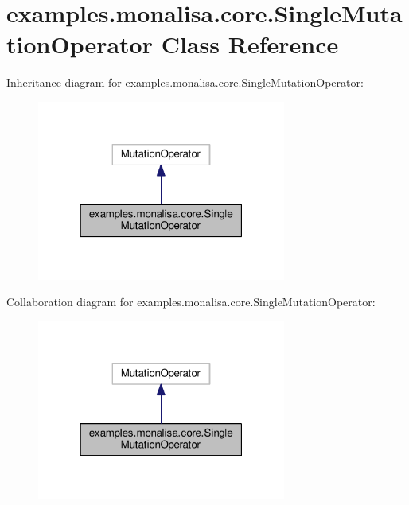 \hypertarget{classexamples_1_1monalisa_1_1core_1_1_single_mutation_operator}{\section{examples.\-monalisa.\-core.\-Single\-Mutation\-Operator Class Reference}
\label{classexamples_1_1monalisa_1_1core_1_1_single_mutation_operator}
}


Inheritance diagram for examples.\-monalisa.\-core.\-Single\-Mutation\-Operator\-:
\nopagebreak
\begin{figure}[H]
\begin{center}
\leavevmode
\includegraphics[width=232pt]{classexamples_1_1monalisa_1_1core_1_1_single_mutation_operator__inherit__graph}
\end{center}
\end{figure}


Collaboration diagram for examples.\-monalisa.\-core.\-Single\-Mutation\-Operator\-:
\nopagebreak
\begin{figure}[H]
\begin{center}
\leavevmode
\includegraphics[width=232pt]{classexamples_1_1monalisa_1_1core_1_1_single_mutation_operator__coll__graph}
\end{center}
\end{figure}
